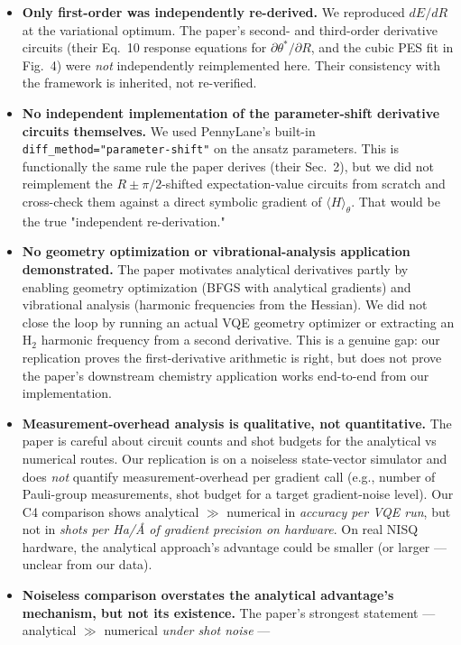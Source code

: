 \documentclass[11pt]{article}
\begin{document}
\begin{itemize}
\item \textbf{Only first-order was independently re-derived.} We reproduced $dE/dR$ at the variational
optimum. The paper's second- and third-order derivative circuits (their Eq.~10 response equations for
$\partial\theta^{*}/\partial R$, and the cubic PES fit in Fig.~4) were \emph{not} independently
reimplemented here. Their consistency with the framework is inherited, not re-verified.
\item \textbf{No independent implementation of the parameter-shift derivative circuits themselves.}
We used PennyLane's built-in \texttt{diff\_method="parameter-shift"} on the ansatz parameters. This
is functionally the same rule the paper derives (their Sec.~2), but we did not reimplement the
$R\pm\pi/2$-shifted expectation-value circuits from scratch and cross-check them against a direct
symbolic gradient of $\langle H\rangle_{\theta}$. That would be the true "independent re-derivation."
\item \textbf{No geometry optimization or vibrational-analysis application demonstrated.} The paper
motivates analytical derivatives partly by enabling geometry optimization (BFGS with analytical
gradients) and vibrational analysis (harmonic frequencies from the Hessian). We did not close the
loop by running an actual VQE geometry optimizer or extracting an H$_2$ harmonic frequency from a
second derivative. This is a genuine gap: our replication proves the first-derivative arithmetic is
right, but does not prove the paper's downstream chemistry application works end-to-end from our
implementation.
\item \textbf{Measurement-overhead analysis is qualitative, not quantitative.} The paper is careful
about circuit counts and shot budgets for the analytical vs numerical routes. Our replication is on
a noiseless state-vector simulator and does \emph{not} quantify measurement-overhead per gradient
call (e.g., number of Pauli-group measurements, shot budget for a target gradient-noise level).
Our C4 comparison shows analytical $\gg$ numerical in \emph{accuracy per VQE run}, but not in
\emph{shots per Ha/\AA{} of gradient precision on hardware}. On real NISQ hardware, the analytical
approach's advantage could be smaller (or larger --- unclear from our data).
\item \textbf{Noiseless comparison overstates the analytical advantage's mechanism, but not its
existence.} The paper's strongest statement --- analytical $\gg$ numerical \emph{under shot noise} ---

\end{itemize}
\end{document}
